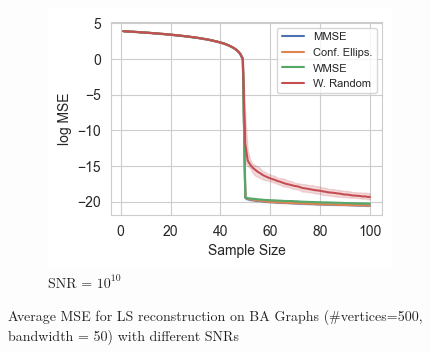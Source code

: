 \begin{figure}
\begin{subfigure}{0.3\columnwidth}
    \includegraphics[width=\columnwidth]{figures/proj1/plots/LS_MSE/BA_3_500_bandwidth_50_SNRdbs_100.0_samps_100_MSE_LS.png}%
    \caption{SNR = $10^{10}$}%
    \label{BA_MSE_subfigc}%
    \end{subfigure}%
    \caption{Average MSE for LS reconstruction on BA Graphs (\#vertices=500, bandwidth = 50) with different SNRs}
\label{LS_BA_MSE_fig}
\end{figure}

